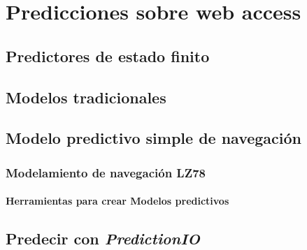 \chapter[Predicciones sobre webaccess]{Predicciones sobre web access}\label{ch:predicciones-webaccess}







\section{Predictores de estado finito}
	

\section{Modelos tradicionales}
	


\section{Modelo predictivo simple de navegación }
	
	
	\subsection{Modelamiento de navegación LZ78}
		




\subsubsection{Herramientas para crear Modelos predictivos}

\section{Predecir con \emph{PredictionIO}}




